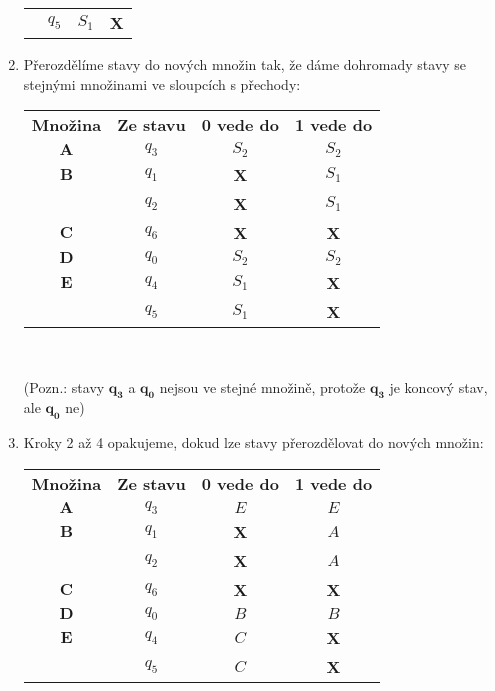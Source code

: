 \documentclass{report}
\begin{document}
\begin{enumerate}
\begin{center}
\begin{tabular}{c|c|c|c}
       & $q_5$ & $S_1$ & \textbf{X} \\
  \end{tabular}
  \end{center}
  \item Přerozdělíme stavy do nových množin tak, že dáme dohromady stavy se stejnými množinami ve sloupcích s přechody:\\
  \begin{center}
  \begin{tabular}{c|c|c|c}
       \textbf{Množina} & \textbf{Ze stavu} & \textbf{0 vede do} & \textbf{1 vede do} \\
       $\mathbf{A}$ & $q_3$ & $S_2$ & $S_2$ \\ \hline
       $\mathbf{B}$ & $q_1$ & \textbf{X} & $S_1$ \\
       & $q_2$ & \textbf{X} & $S_1$ \\ \hline
       $\mathbf{C}$ & $q_6$ & \textbf{X} & \textbf{X} \\ \hline
       $\mathbf{D}$ & $q_0$ & $S_2$ & $S_2$ \\ \hline
       $\mathbf{E}$ & $q_4$ & $S_1$ & \textbf{X} \\
       & $q_5$ & $S_1$ & \textbf{X} \\
  \end{tabular}
  \\
  \end{center}
  (Pozn.: stavy $\mathbf{q_3}$ a $\mathbf{q_0}$ nejsou ve stejné množině, protože $\mathbf{q_3}$ je koncový stav, ale $\mathbf{q_0}$ ne)
  \pagebreak
  \item Kroky 2 až 4 opakujeme, dokud lze stavy přerozdělovat do nových množin:\\
  \begin{center}
  \begin{tabular}{c|c|c|c}
       \textbf{Množina} & \textbf{Ze stavu} & \textbf{0 vede do} & \textbf{1 vede do} \\
       $\mathbf{A}$ & $q_3$ & $E$ & $E$ \\ \hline
       $\mathbf{B}$ & $q_1$ & \textbf{X} & $A$ \\
       & $q_2$ & \textbf{X} & $A$ \\ \hline
       $\mathbf{C}$ & $q_6$ & \textbf{X} & \textbf{X} \\ \hline
       $\mathbf{D}$ & $q_0$ & $B$ & $B$ \\ \hline
       $\mathbf{E}$ & $q_4$ & $C$ & \textbf{X} \\
       & $q_5$ & $C$ & \textbf{X} \\

\end{tabular}
\end{center}
\end{enumerate}
\end{document}
